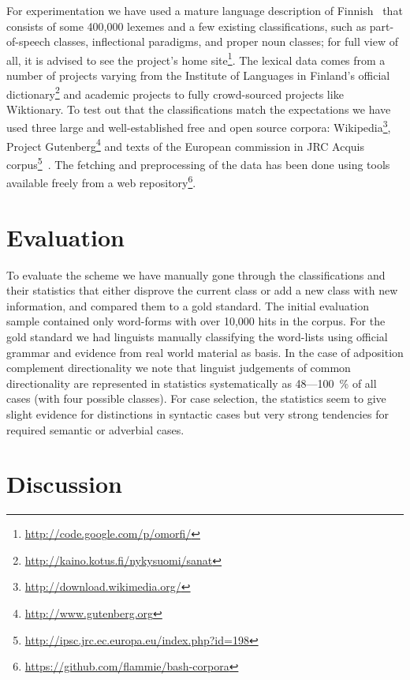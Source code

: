 \documentclass[a5paper]{article}
\begin{document}
For experimentation we have used a mature language description of
Finn\-ish~\cite{pirinen2008suomen} that consists of some 400,000 lexemes and a few
existing classifications, such as part-of-speech classes, inflectional
paradigms, and proper noun classes; for full view of all, it is advised to see
the project's home site\footnote{\url{http://code.google.com/p/omorfi/}}. The
lexical data comes from a number of projects varying from the Institute of Languages
in Finland's official
dictionary\footnote{\url{http://kaino.kotus.fi/nykysuomi/sanat}} and academic
projects to fully crowd-sourced projects like Wiktionary. To test out that the
classifications match the expectations we have used three large and
well-established free and open source corpora:
Wikipedia\footnote{\url{http://download.wikimedia.org/}}, Project
Gutenberg\footnote{\url{http://www.gutenberg.org}} and texts of the European
commission in JRC Acquis
corpus\footnote{\url{http://ipsc.jrc.ec.europa.eu/index.php?id=198}}~\cite{steinberger2006jrc}.
The fetching and preprocessing of the data has been done using tools available
freely from a web
repository\footnote{\url{https://github.com/flammie/bash-corpora}}.

\section{Evaluation}

To evaluate the scheme we have manually gone through the classifications and
their statistics that either disprove the current class or add a new class
with new information, and compared them to a gold standard. 
The initial evaluation sample contained
only word-forms with over 10,000 hits in the corpus. 
For the gold standard we had linguists manually classifying the word-lists using 
official grammar and evidence from real world material as basis. 
In the case of adposition
complement directionality we note that linguist judgements of common
directionality are represented in statistics systematically as 48---100~\% of
all cases (with four possible classes). 
For case selection, the statistics seem to give slight evidence for
distinctions in syntactic cases
but very strong tendencies for required semantic or adverbial cases.


\section{Discussion}
\end{document}
